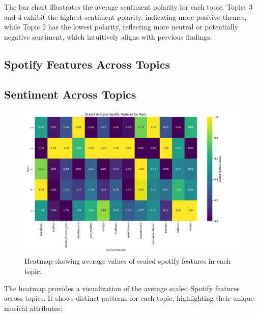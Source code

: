 The bar chart illustrates the average sentiment polarity for each topic. Topics
3 and 4 exhibit the highest sentiment polarity, indicating more positive
themes, while Topic 2 has the lowest polarity, reflecting more neutral or
potentially negative sentiment, which intuitively aligns with previous
findings.


\subsection{Spotify Features Across Topics}

\subsection{Sentiment Across Topics}
\begin{center}
\begin{figure}[H]
  \centering
  \includegraphics[width=5in]{img/lda_spotify_features.png}
  \caption{Heatmap showing average values of scaled spotify features in each
  topic.}
  \label{Figure:fig_eh}
\end{figure}
\end{center}

The heatmap provides a visualization of the average scaled Spotify features
across topics. It shows distinct patterns for each topic, highlighting their
unique musical attributes:

